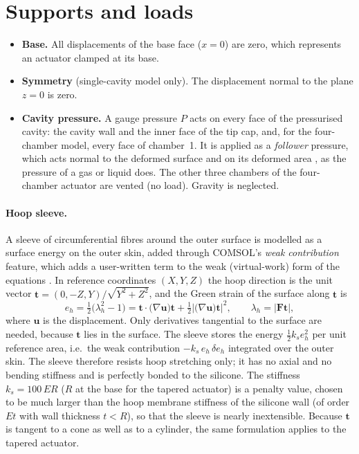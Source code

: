 \documentclass[12pt,a4paper,oneside]{report}
\numberwithin{equation}{chapter}
\numberwithin{figure}{chapter}
\numberwithin{table}{chapter}
\begin{document}
\section{Supports and loads}
\begin{itemize}
\item \textbf{Base.} All displacements of the base face ($x=0$) are zero, which represents an actuator clamped
at its base.
\item \textbf{Symmetry} (single-cavity model only). The displacement normal to the plane $z=0$ is zero.
\item \textbf{Cavity pressure.} A gauge pressure $P$ acts on every face of the pressurised cavity: the
cavity wall and the inner face of the tip cap, and, for the four-chamber model, every face of chamber~1. It
is applied as a \emph{follower} pressure, which acts normal to the deformed surface and on its deformed
area \cite{comsolsm}, as the pressure of a gas or liquid does. The other three chambers of the four-chamber
actuator are vented (no load). Gravity is neglected.
\end{itemize}

\paragraph{Hoop sleeve.} A sleeve of circumferential fibres around the outer surface is modelled as a
surface energy on the outer skin, added through COMSOL's \emph{weak contribution} feature, which adds a
user-written term to the weak (virtual-work) form of the equations \cite{comsol}. In reference
coordinates $(X,Y,Z)$ the hoop direction is the unit vector $\bm t=(0,-Z,Y)/\sqrt{Y^2+Z^2}$, and the Green
strain of the surface along $\bm t$ is \cite{holzapfel2000}
\begin{equation}
e_h=\tfrac12\big(\lambda_h^2-1\big)=\bm t\cdot\big(\nabla\bm u\big)\bm t+\tfrac12\big|\big(\nabla\bm u\big)\bm t\big|^2 ,
\qquad \lambda_h=|\bm F\bm t| ,
\end{equation}
where $\bm u$ is the displacement. Only derivatives tangential to the surface are needed, because $\bm t$ lies
in the surface. The sleeve stores the energy $\tfrac12 k_s e_h^2$ per unit reference area, i.e.\ the weak
contribution $-k_s\,e_h\,\delta e_h$ integrated over the outer skin. The sleeve therefore resists hoop
stretching only; it has no axial and no bending stiffness and is perfectly bonded to the silicone. The stiffness
$k_s=100\,ER$ ($R$ at the base for the tapered actuator) is a penalty value, chosen to be much larger than
the hoop membrane stiffness of the silicone wall (of order $Et$ with wall thickness $t<R$), so that the
sleeve is nearly inextensible. Because $\bm t$ is tangent to a cone as well as to a cylinder, the same
formulation applies to the tapered actuator.
\end{document}
